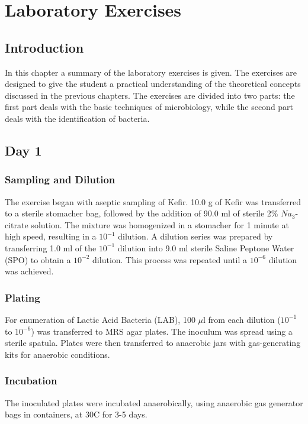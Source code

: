 \chapter{Laboratory Exercises}
\setlength{\headheight}{12.71342pt}
\addtolength{\topmargin}{-0.71342pt}

\section*{Introduction}
In this chapter a summary of the laboratory exercises is given. The exercises are designed to give the student a practical understanding of the theoretical concepts discussed in the previous chapters. The exercises are divided into two parts: the first part deals with the basic techniques of microbiology, while the second part deals with the identification of bacteria. 

\section{Day 1}
\subsection*{Sampling and Dilution}
The exercise began with aseptic sampling of Kefir. 10.0 g of Kefir was transferred to a sterile stomacher bag, followed by the addition of 90.0 ml of sterile 2\% $Na_3$-citrate solution. The mixture was homogenized in a stomacher for 1 minute at high speed, resulting in a $10^{-1}$ dilution.
\vspace{0.5em}
A dilution series was prepared by transferring 1.0 ml of the $10^{-1}$ dilution into 9.0 ml sterile Saline Peptone Water (SPO) to obtain a $10^{-2}$ dilution. This process was repeated until a $10^{-6}$ dilution was achieved.

\subsection*{Plating}
For enumeration of Lactic Acid Bacteria (LAB), 100 $\mu$l from each dilution ($10^{-1}$ to $10^{-6}$) was transferred to MRS agar plates. The inoculum was spread using a sterile spatula. Plates were then transferred to anaerobic jars with gas-generating kits for anaerobic conditions.

\subsection*{Incubation}
The inoculated plates were incubated anaerobically, using anaerobic gas generator bags in containers, at 30\textdegree C for 3-5 days.

